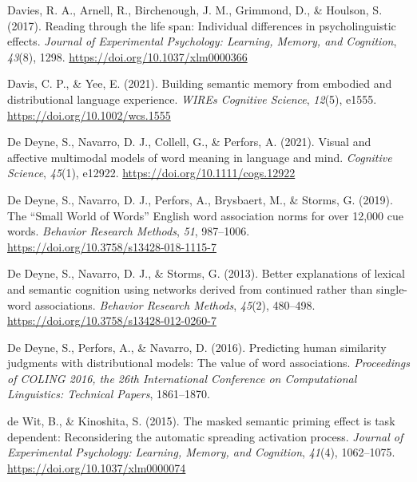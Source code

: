 \documentclass[
  12pt,
  man,floatsintext]{apa7}
\newlength{\cslhangindent}
\newlength{\cslentryspacingunit} %
\newenvironment{CSLReferences}[2] %
 {%
  \setlength{\parindent}{0pt}
  \ifodd #1
  \let\oldpar\par
  \def\par{\hangindent=\cslhangindent\oldpar}
  \fi
  \setlength{\parskip}{#2\cslentryspacingunit}
 }%
 {}
\begin{document}
\begin{CSLReferences}{1}{0}
\leavevmode{}%
Davies, R. A., Arnell, R., Birchenough, J. M., Grimmond, D., \& Houlson, S. (2017). Reading through the life span: {Individual} differences in psycholinguistic effects. \emph{Journal of Experimental Psychology: Learning, Memory, and Cognition}, \emph{43}(8), 1298. \url{https://doi.org/10.1037/xlm0000366}

\leavevmode{}%
Davis, C. P., \& Yee, E. (2021). Building semantic memory from embodied and distributional language experience. \emph{WIREs Cognitive Science}, \emph{12}(5), e1555. \url{https://doi.org/10.1002/wcs.1555}

\leavevmode{}%
De Deyne, S., Navarro, D. J., Collell, G., \& Perfors, A. (2021). Visual and affective multimodal models of word meaning in language and mind. \emph{Cognitive Science}, \emph{45}(1), e12922. \url{https://doi.org/10.1111/cogs.12922}

\leavevmode{}%
De Deyne, S., Navarro, D. J., Perfors, A., Brysbaert, M., \& Storms, G. (2019). The {``{Small World} of {Words}''} {English} word association norms for over 12,000 cue words. \emph{Behavior Research Methods}, \emph{51}, 987--1006. \url{https://doi.org/10.3758/s13428-018-1115-7}

\leavevmode{}%
De Deyne, S., Navarro, D. J., \& Storms, G. (2013). Better explanations of lexical and semantic cognition using networks derived from continued rather than single-word associations. \emph{Behavior Research Methods}, \emph{45}(2), 480--498. \url{https://doi.org/10.3758/s13428-012-0260-7}

\leavevmode{}%
De Deyne, S., Perfors, A., \& Navarro, D. (2016). Predicting human similarity judgments with distributional models: {The} value of word associations. \emph{Proceedings of {COLING} 2016, the 26th International Conference on Computational Linguistics: {Technical} Papers}, 1861--1870.

\leavevmode{}%
de Wit, B., \& Kinoshita, S. (2015). The masked semantic priming effect is task dependent: {Reconsidering} the automatic spreading activation process. \emph{Journal of Experimental Psychology: Learning, Memory, and Cognition}, \emph{41}(4), 1062--1075. \url{https://doi.org/10.1037/xlm0000074}


\end{CSLReferences}
\end{document}
